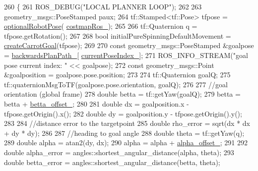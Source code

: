 \begin{DoxyCode}
260 \{
261     ROS\_DEBUG(\textcolor{stringliteral}{"LOCAL PLANNER LOOP"});
262 
263     geometry\_msgs::PoseStamped paux;
264     tf::Stamped<tf::Pose> tfpose = \hyperlink{namespacemove__base__z__client_1_1backward__local__planner_a80dbd10807e5f70adfcd0ff4dcb7c1db}{optionalRobotPose}(
      \hyperlink{classmove__base__z__client_1_1backward__local__planner_1_1BackwardLocalPlanner_a865618f84238fe6ff437d1e38ec5fec0}{costmapRos\_});
265 
266     tf::Quaternion q = tfpose.getRotation();
267 
268     \textcolor{keywordtype}{bool} initialPureSpinningDefaultMovement = \hyperlink{classmove__base__z__client_1_1backward__local__planner_1_1BackwardLocalPlanner_a0a48c91cb8043aa15d01eec4931e8552}{createCarrotGoal}(tfpose);
269 
270     \textcolor{keyword}{const} geometry\_msgs::PoseStamped &goalpose = \hyperlink{classmove__base__z__client_1_1backward__local__planner_1_1BackwardLocalPlanner_a451add2af7d6d83a7415277311b3ed04}{backwardsPlanPath\_}[
      \hyperlink{classmove__base__z__client_1_1backward__local__planner_1_1BackwardLocalPlanner_af304b2e7cde744ad905a1ae7889102b6}{currentPoseIndex\_}];
271     ROS\_INFO\_STREAM(\textcolor{stringliteral}{"goal pose current index: "} << goalpose);
272     \textcolor{keyword}{const} geometry\_msgs::Point &goalposition = goalpose.pose.position;
273 
274     tf::Quaternion goalQ;
275     tf::quaternionMsgToTF(goalpose.pose.orientation, goalQ);
276 
277     \textcolor{comment}{//goal orientation (global frame)}
278     \textcolor{keywordtype}{double} betta = tf::getYaw(goalQ);
279     betta = betta + \hyperlink{classmove__base__z__client_1_1backward__local__planner_1_1BackwardLocalPlanner_ae35f99afc3c859a4b14d0417ef7839df}{betta\_offset\_};
280 
281     \textcolor{keywordtype}{double} dx = goalposition.x - tfpose.getOrigin().x();
282     \textcolor{keywordtype}{double} dy = goalposition.y - tfpose.getOrigin().y();
283 
284     \textcolor{comment}{//distance error to the targetpoint}
285     \textcolor{keywordtype}{double} rho\_error = sqrt(dx * dx + dy * dy);
286 
287     \textcolor{comment}{//heading to goal angle}
288     \textcolor{keywordtype}{double} theta = tf::getYaw(q);
289     \textcolor{keywordtype}{double} alpha = atan2(dy, dx);
290     alpha = alpha + \hyperlink{classmove__base__z__client_1_1backward__local__planner_1_1BackwardLocalPlanner_ad406c50cdc7a7603c023718543fc2f5c}{alpha\_offset\_};
291 
292     \textcolor{keywordtype}{double} alpha\_error = angles::shortest\_angular\_distance(alpha, theta);
293     \textcolor{keywordtype}{double} betta\_error = angles::shortest\_angular\_distance(betta, theta);

\end{DoxyCode}
